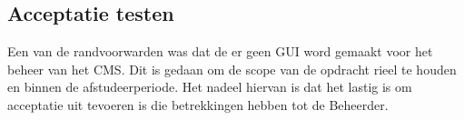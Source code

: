 \subsection{Acceptatie testen}
Een van de randvoorwarden was dat de er geen \gls{GUI} word gemaakt voor het beheer van het CMS.
Dit is gedaan om de scope van de opdracht rieel te houden en binnen de afstudeerperiode.
Het nadeel hiervan is dat het lastig is om acceptatie uit tevoeren is die betrekkingen hebben tot de \gls{Beheerder}.
